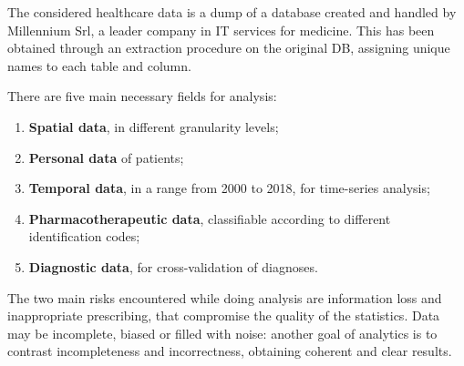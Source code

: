 The considered healthcare data is a dump of a database created and handled by Millennium Srl\cite{millewin}, a leader company in IT services for medicine. This has been obtained through an extraction procedure on the original DB, assigning unique names to each table and column.

There are five main necessary fields for analysis\cite{DC}:
\begin{enumerate}
	\item \textbf{Spatial data}, in different granularity levels;
	\item \textbf{Personal data} of patients;
	\item \textbf{Temporal data}, in a range from 2000 to 2018, for time-series analysis;
	\item \textbf{Pharmacotherapeutic data}, classifiable according to different identification codes;
	\item \textbf{Diagnostic data}, for cross-validation of diagnoses.
\end{enumerate}

The two main risks encountered while doing analysis are information loss and inappropriate prescribing, that compromise the quality of the statistics. Data may be incomplete, biased or filled with noise: another goal of analytics is to contrast incompleteness and incorrectness, obtaining coherent and clear results.
